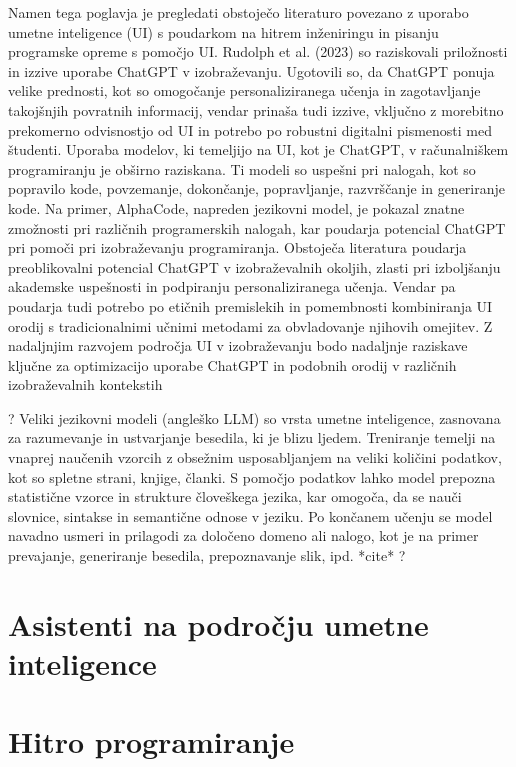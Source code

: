 \documentclass[12pt,a4paper]{book}
\begin{document}
\cite{app13095783}
Namen tega poglavja je pregledati obstoječo literaturo povezano z uporabo umetne inteligence (UI) s poudarkom na hitrem inženiringu in pisanju programske opreme s pomočjo UI. 
Rudolph et al. (2023) so raziskovali priložnosti in izzive uporabe ChatGPT v izobraževanju. Ugotovili so, da ChatGPT ponuja velike prednosti, kot so omogočanje personaliziranega učenja in zagotavljanje takojšnjih povratnih informacij, vendar prinaša tudi izzive, vključno z morebitno prekomerno odvisnostjo od UI in potrebo po robustni digitalni pismenosti med študenti.
Uporaba modelov, ki temeljijo na UI, kot je ChatGPT, v računalniškem programiranju je obširno raziskana. Ti modeli so uspešni pri nalogah, kot so popravilo kode, povzemanje, dokončanje, popravljanje, razvrščanje in generiranje kode. Na primer, AlphaCode, napreden jezikovni model, je pokazal znatne zmožnosti pri različnih programerskih nalogah, kar poudarja potencial ChatGPT pri pomoči pri izobraževanju programiranja.
Obstoječa literatura poudarja preoblikovalni potencial ChatGPT v izobraževalnih okoljih, zlasti pri izboljšanju akademske uspešnosti in podpiranju personaliziranega učenja. Vendar pa poudarja tudi potrebo po etičnih premislekih in pomembnosti kombiniranja UI orodij s tradicionalnimi učnimi metodami za obvladovanje njihovih omejitev. Z nadaljnjim razvojem področja UI v izobraževanju bodo nadaljnje raziskave ključne za optimizacijo uporabe ChatGPT in podobnih orodij v različnih izobraževalnih kontekstih

? Veliki jezikovni modeli (angleško LLM) so vrsta umetne inteligence, zasnovana za razumevanje in ustvarjanje besedila, ki je blizu ljedem. Treniranje temelji na vnaprej naučenih vzorcih z obsežnim usposabljanjem na veliki količini podatkov, kot so spletne strani, knjige, članki. S pomočjo podatkov lahko model prepozna statistične vzorce in strukture človeškega jezika, kar omogoča, da se nauči slovnice, sintakse in semantične odnose v jeziku. Po končanem učenju se model navadno usmeri in prilagodi za določeno domeno ali nalogo, kot je na primer prevajanje, generiranje besedila, prepoznavanje slik, ipd. *cite* ?
\section{Asistenti na področju umetne inteligence} 

\section{Hitro programiranje}
\end{document}
